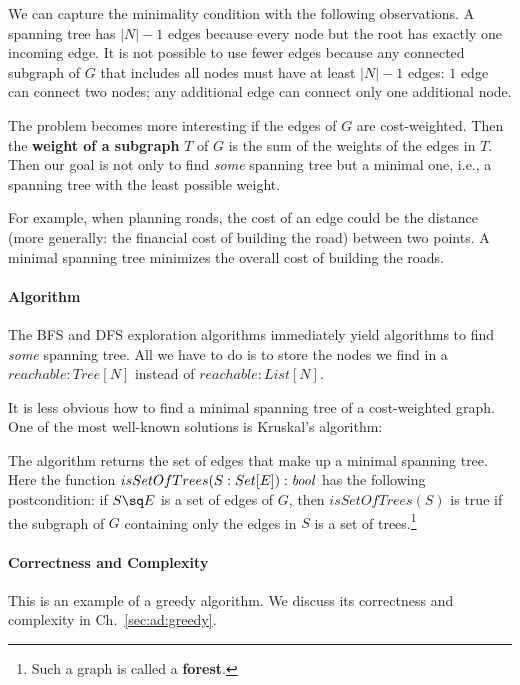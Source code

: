 We can capture the minimality condition with the following observations.
A spanning tree has $|N|-1$ edges because every node but the root has exactly one incoming edge.
It is not possible to use fewer edges because any connected subgraph of $G$ that includes all nodes must have at least $|N|-1$ edges: $1$ edge can connect two nodes; any additional edge can connect only one additional node.

The problem becomes more interesting if the edges of $G$ are cost-weighted.
Then the \textbf{weight of a subgraph} $T$ of $G$ is the sum of the weights of the edges in $T$.
Then our goal is not only to find \emph{some} spanning tree but a minimal one, i.e., a spanning tree with the least possible weight.

For example, when planning roads, the cost of an edge could be the distance (more generally: the financial cost of building the road) between two points.
A minimal spanning tree minimizes the overall cost of building the roads.

\paragraph{Algorithm}
The BFS and DFS exploration algorithms immediately yield algorithms to find \emph{some} spanning tree.
All we have to do is to store the nodes we find in a $reachable: Tree[N]$ instead of $reachable:List[N]$.

It is less obvious how to find a minimal spanning tree of a cost-weighted graph.
One of the most well-known solutions is Kruskal's algorithm:

\begin{acode}
\end{acode}
The algorithm returns the set of edges that make up a minimal spanning tree.
Here the function $isSetOfTrees(S: Set[E]):\mathit{bool}$ has the following postcondition: if $S\sq E$ is a set of edges of $G$, then $isSetOfTrees(S)$ is true if the subgraph of $G$ containing only the edges in $S$ is a set of trees.\footnote{Such a graph is called a \textbf{forest}.}

\paragraph{Correctness and Complexity}
This is an example of a greedy algorithm.
We discuss its correctness and complexity in Ch.~\ref{sec:ad:greedy}.

